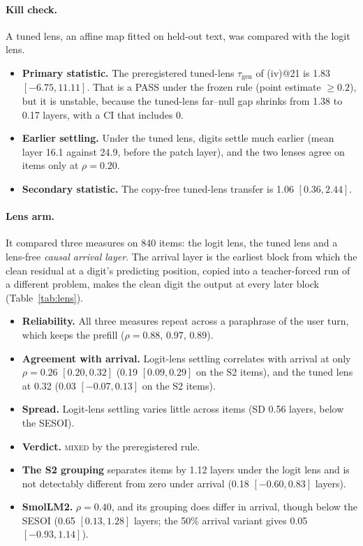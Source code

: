 \documentclass[11pt]{article}
\newcommand{\verdict}[1]{\textsc{\MakeLowercase{#1}}}
\begin{document}
\paragraph{Kill check.} A tuned lens, an affine map fitted on held-out text, was compared with the logit lens.
\begin{itemize}
\item \textbf{Primary statistic.} The preregistered tuned-lens $\tau_\text{gen}$ of (iv)@21 is 1.83 $[-6.75, 11.11]$. That is a PASS under the frozen rule (point estimate $\ge 0.2$), but it is unstable, because the tuned-lens far--null gap shrinks from 1.38 to 0.17 layers, with a CI that includes 0.
\item \textbf{Earlier settling.} Under the tuned lens, digits settle much earlier (mean layer 16.1 against 24.9, before the patch layer), and the two lenses agree on items only at $\rho = 0.20$.
\item \textbf{Secondary statistic.} The copy-free tuned-lens transfer is 1.06 $[0.36, 2.44]$.
\end{itemize}

\paragraph{Lens arm.} It compared three measures on 840 items: the logit lens, the tuned lens and a lens-free \emph{causal arrival layer}. The arrival layer is the earliest block from which the clean residual at a digit's predicting position, copied into a teacher-forced run of a different problem, makes the clean digit the output at every later block (Table~\ref{tab:lens}).
\begin{itemize}
\item \textbf{Reliability.} All three measures repeat across a paraphrase of the user turn, which keeps the prefill ($\rho = 0.88$, $0.97$, $0.89$).
\item \textbf{Agreement with arrival.} Logit-lens settling correlates with arrival at only $\rho = 0.26$ $[0.20, 0.32]$ (0.19 $[0.09, 0.29]$ on the S2 items), and the tuned lens at 0.32 (0.03 $[-0.07, 0.13]$ on the S2 items).
\item \textbf{Spread.} Logit-lens settling varies little across items (SD 0.56 layers, below the SESOI).
\item \textbf{Verdict.} \verdict{MIXED} by the preregistered rule.
\item \textbf{The S2 grouping} separates items by 1.12 layers under the logit lens and is not detectably different from zero under arrival (0.18 $[-0.60, 0.83]$ layers).
\item \textbf{SmolLM2.} $\rho = 0.40$, and its grouping does differ in arrival, though below the SESOI (0.65 $[0.13, 1.28]$ layers; the 50\% arrival variant gives 0.05 $[-0.93, 1.14]$).
\end{itemize}
\end{document}
